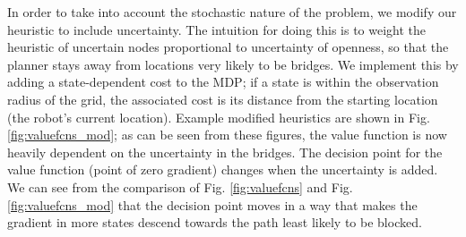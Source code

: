 \documentclass{article}
\begin{document}
In order to take into account the stochastic nature of the problem, we modify our heuristic to include uncertainty. The intuition for doing this is to weight the heuristic of uncertain nodes proportional to uncertainty of openness, so that the planner stays away from locations very likely to be bridges. We implement this by adding a state-dependent cost to the MDP; if a state is within the observation radius of the grid, the associated cost is its distance from the starting location (the robot's current location). Example modified heuristics are shown in Fig. \ref{fig:valuefcns_mod}; as can be seen from these figures, the value function is now heavily dependent on the uncertainty in the bridges. The decision point for the value function (point of zero gradient) changes when the uncertainty is added. We can see from the comparison of Fig. \ref{fig:valuefcns} and Fig. \ref{fig:valuefcns_mod} that the decision point moves in a way that makes the gradient in more states descend towards the path least likely to be blocked. 
\end{document}
